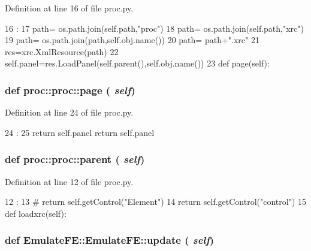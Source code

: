 Definition at line 16 of file proc.py.


\begin{DoxyCode}
16                      :
17         path= os.path.join(self.path,"proc")
18         path= os.path.join(self.path,"xrc")
19         path= os.path.join(path,self.obj.name())
20         path= path+".xrc"
21         res=xrc.XmlResource(path)
22         self.panel=res.LoadPanel(self.parent(),self.obj.name())
23         
    def page(self):
\end{DoxyCode}
\hypertarget{classproc_1_1proc_ac70ada08e4fc982a3e61e9ee77b247bf}{
\subsubsection[{page}]{\setlength{\rightskip}{0pt plus 5cm}def proc::proc::page ( {\em self})}}
\label{classproc_1_1proc_ac70ada08e4fc982a3e61e9ee77b247bf}


Definition at line 24 of file proc.py.


\begin{DoxyCode}
24                   :
25         return self.panel
        return self.panel
\end{DoxyCode}
\hypertarget{classproc_1_1proc_a73ad55427f28a79ef0483e18ce996e14}{
\subsubsection[{parent}]{\setlength{\rightskip}{0pt plus 5cm}def proc::proc::parent ( {\em self})}}
\label{classproc_1_1proc_a73ad55427f28a79ef0483e18ce996e14}


Definition at line 12 of file proc.py.


\begin{DoxyCode}
12                     :
13 #        return self.getControl("Element")   
14         return self.getControl("control")
15 
    def loadxrc(self):
\end{DoxyCode}
\hypertarget{classEmulateFE_1_1EmulateFE_ae73ba5d5c8b1b1fda2e5325bdfcb2eae}{
\subsubsection[{update}]{\setlength{\rightskip}{0pt plus 5cm}def EmulateFE::EmulateFE::update ( {\em self})}}
\label{classEmulateFE_1_1EmulateFE_ae73ba5d5c8b1b1fda2e5325bdfcb2eae}


